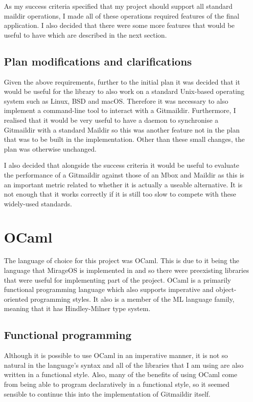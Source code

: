 As my success criteria specified that my project should support all standard maildir operations, I made all of these operations required features of the final application. I also decided that there were some more features that would be useful to have which are described in the next section.

\subsection{Plan modifications and clarifications}

Given the above requirements, further to the initial plan it was decided that it would be useful for the library to also work on a standard Unix-based operating system such as Linux, BSD and macOS. Therefore it was necessary to also implement a command-line tool to interact with a Gitmaildir. Furthermore, I realised that it would be very useful to have a daemon to synchronise a Gitmaildir with a standard Maildir so this was another feature not in the plan that was to be built in the implementation. Other than these small changes, the plan was otherwise unchanged.

I also decided that alongside the success criteria it would be useful to evaluate the performance of a Gitmaildir against those of an Mbox and Maildir as this is an important metric related to whether it is actually a useable alternative. It is not enough that it works correctly if it is still too slow to compete with these widely-used standards.

\section{OCaml}

The language of choice for this project was OCaml\cite{code_ocaml}. This is due to it being the language that MirageOS is implemented in and so there were preexisting libraries that were useful for implementing part of the project. OCaml is a primarily functional programming language which also supports imperative and object-oriented programming styles. It also is a member of the ML language family, meaning that it has Hindley-Milner type system.

\subsection{Functional programming}

Although it is possible to use OCaml in an imperative manner, it is not so natural in the language's syntax and all of the libraries that I am using are also written in a functional style. Also, many of the benefits of using OCaml come from being able to program declaratively in a functional style, so it seemed sensible to continue this into the implementation of Gitmaildir itself.

